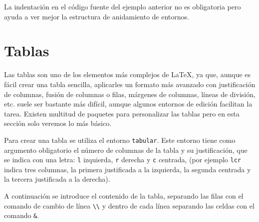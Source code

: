 \documentclass[
  a4paper,
]{scrreport}
\theoremstyle{definition}
\theoremstyle{remark}
\begin{document}
La indentación en el código fuente del ejemplo anterior no es
obligatoria pero ayuda a ver mejor la estructura de anidamiento de
entornos.


\chapter{Tablas}\label{sec-tablas}

Las tablas son uno de los elementos más complejos de \LaTeX, ya que,
aunque es fácil crear una tabla sencilla, aplicarles un formato más
avanzado con justificación de columnas, fusión de columnas o filas,
márgenes de columnas, líneas de división, etc. suele ser bastante más
difícil, aunque algunos entornos de edición facilitan la tarea. Existen
multitud de paquetes para personalizar las tablas pero en esta sección
solo veremos lo más básico.

Para crear una tabla se utiliza el entorno \texttt{tabular}. Este
entorno tiene como argumento obligatorio el número de columnas de la
tabla y su justificación, que se indica con una letra: \texttt{l}
izquierda, \texttt{r} derecha y \texttt{c} centrada, (por ejemplo
\texttt{lcr} indica tres columnas, la primera justificada a la
izquierda, la segunda centrada y la tercera justificada a la derecha).

A continuación se introduce el contenido de la tabla, separando las
filas con el comando de cambio de línea
\texttt{\textbackslash{}\textbackslash{}} y dentro de cada línea
separando las celdas con el comando \texttt{\&}.
\end{document}
